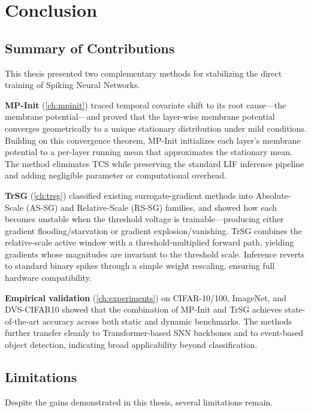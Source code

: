 \chapter{Conclusion}
\label{ch:conclusion}

\section{Summary of Contributions}
\label{sec:conclusion_summary}

This thesis presented two complementary methods for stabilizing the direct training of Spiking Neural Networks.

\textbf{MP-Init} (\cref{ch:mpinit}) traced temporal covariate shift to its root cause—the membrane potential—and proved that the layer-wise membrane potential converges geometrically to a unique stationary distribution under mild conditions. Building on this convergence theorem, MP-Init initializes each layer's membrane potential to a per-layer running mean that approximates the stationary mean. The method eliminates TCS while preserving the standard LIF inference pipeline and adding negligible parameter or computational overhead.

\textbf{TrSG} (\cref{ch:trsg}) classified existing surrogate-gradient methods into Absolute-Scale (AS-SG) and Relative-Scale (RS-SG) families, and showed how each becomes unstable when the threshold voltage is trainable—producing either gradient flooding/starvation or gradient explosion/vanishing. TrSG combines the relative-scale active window with a threshold-multiplied forward path, yielding gradients whose magnitudes are invariant to the threshold scale. Inference reverts to standard binary spikes through a simple weight rescaling, ensuring full hardware compatibility.

\textbf{Empirical validation} (\cref{ch:experiments}) on CIFAR-10/100, ImageNet, and DVS-CIFAR10 showed that the combination of MP-Init and TrSG achieves state-of-the-art accuracy across both static and dynamic benchmarks. The methods further transfer cleanly to Transformer-based SNN backbones and to event-based object detection, indicating broad applicability beyond classification.

\section{Limitations}
\label{sec:conclusion_limitations}

Despite the gains demonstrated in this thesis, several limitations remain.

